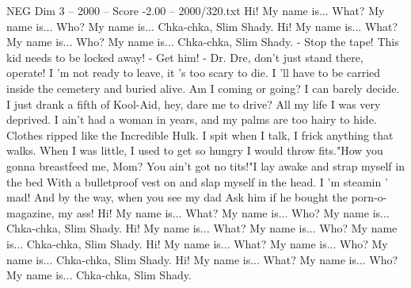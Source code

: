 \begin{textsample}{NEG Dim 3 – 2000 – Score -2.00 – 2000/320.txt}
Hi!
My name is...
What?
My name is...
Who?
My name is...
Chka-chka, Slim Shady.
Hi!
My name is...
What?
My name is...
Who?
My name is...
Chka-chka, Slim Shady. - Stop the tape!
This kid needs to be locked away! - Get him! - Dr.
Dre, don't just stand there, operate!
I 'm not ready to leave, it 's too scary to die.
I 'll have to be carried inside the cemetery and buried alive.
Am I coming or going?
I can barely decide.
I just drank a fifth of Kool-Aid, hey, dare me to drive?
All my life I was very deprived.
I ain't had a woman in years, and my palms are too hairy to hide.
Clothes ripped like the Incredible Hulk.
I spit when I talk, I frick anything that walks.
When I was little, I used to get so hungry I would throw fits."How you gonna breastfeed me, Mom?
You ain't got no tits!"I lay awake and strap myself in the bed With a bulletproof vest on and slap myself in the head.
I 'm steamin ' mad!
And by the way, when you see my dad Ask him if he bought the porn-o-magazine, my ass!
Hi!
My name is...
What?
My name is...
Who?
My name is...
Chka-chka, Slim Shady.
Hi!
My name is...
What?
My name is...
Who?
My name is...
Chka-chka, Slim Shady.
Hi!
My name is...
What?
My name is...
Who?
My name is...
Chka-chka, Slim Shady.
Hi!
My name is...
What?
My name is...
Who?
My name is...
Chka-chka, Slim Shady.

\end{textsample}
